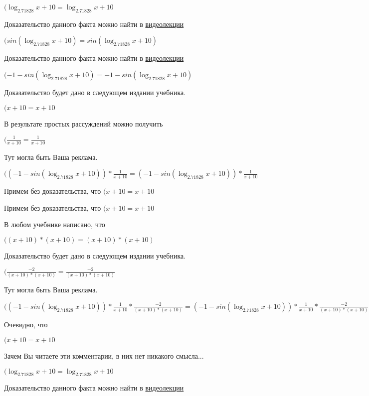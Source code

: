\documentclass[12pt,a4paper,fleqn]{article}
\theoremstyle{definition}
\begin{document}
$(\log_{ 2.71828 }{ x  +  10 } = \log_{ 2.71828 }{ x  +  10 }$

Доказательство данного факта можно найти в \href{https://www.youtube.com/watch?v=dQw4w9WgXcQ}{видеолекции}

$(sin(\log_{ 2.71828 }{ x  +  10 }) = sin(\log_{ 2.71828 }{ x  +  10 })$

Доказательство данного факта можно найти в \href{https://www.youtube.com/watch?v=dQw4w9WgXcQ}{видеолекции}

$( -1  - sin(\log_{ 2.71828 }{ x  +  10 }) =  -1  - sin(\log_{ 2.71828 }{ x  +  10 })$

Доказательство будет дано в следующем издании учебника.

$( x  +  10  =  x  +  10 $

В результате простых рассуждений можно получить

$(\frac{ 1 }{ x  +  10 }
 = \frac{ 1 }{ x  +  10 }
$

Тут могла быть Ваша реклама.

$(( -1  - sin(\log_{ 2.71828 }{ x  +  10 })) * \frac{ 1 }{ x  +  10 }
 = ( -1  - sin(\log_{ 2.71828 }{ x  +  10 })) * \frac{ 1 }{ x  +  10 }
$

Примем без доказательства, что
$( x  +  10  =  x  +  10 $

Примем без доказательства, что
$( x  +  10  =  x  +  10 $

В любом учебнике написано, что

$(( x  +  10 ) * ( x  +  10 ) = ( x  +  10 ) * ( x  +  10 )$

Доказательство будет дано в следующем издании учебника.

$(\frac{ -2 }{( x  +  10 ) * ( x  +  10 )}
 = \frac{ -2 }{( x  +  10 ) * ( x  +  10 )}
$

Тут могла быть Ваша реклама.

$(( -1  - sin(\log_{ 2.71828 }{ x  +  10 })) * \frac{ 1 }{ x  +  10 }
 * \frac{ -2 }{( x  +  10 ) * ( x  +  10 )}
 = ( -1  - sin(\log_{ 2.71828 }{ x  +  10 })) * \frac{ 1 }{ x  +  10 }
 * \frac{ -2 }{( x  +  10 ) * ( x  +  10 )}
$

Очевидно, что

$( x  +  10  =  x  +  10 $

Зачем Вы читаете эти комментарии, в них нет никакого смысла...

$(\log_{ 2.71828 }{ x  +  10 } = \log_{ 2.71828 }{ x  +  10 }$

Доказательство данного факта можно найти в \href{https://www.youtube.com/watch?v=dQw4w9WgXcQ}{видеолекции}
\end{document}
